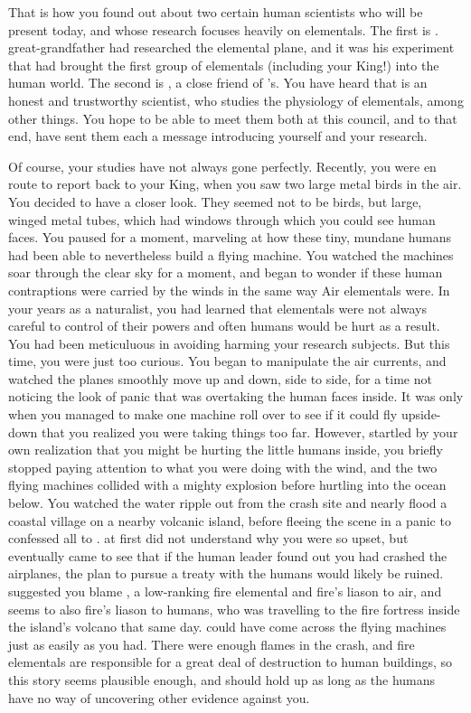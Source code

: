 \documentclass[char]{elementals}
\begin{document}
That is how you found out about two certain human scientists who will be present today, and whose research focuses heavily on elementals.  The first is \cGD{\intro}.  \cGD{\Their} great-grandfather had researched the elemental plane, and it was his experiment that had brought the first group of elementals (including your King!) into the human world.  The second is \cScientist{\intro}, a close friend of \cDiplomat{}'s.  You have heard that \cScientist{} is an honest and trustworthy scientist, who studies the physiology of elementals, among other things.  You hope to be able to meet them both at this council, and to that end, have sent them each a message introducing yourself and your research.

Of course, your studies have not always gone perfectly.  Recently, you were en route to report back to your King, when you saw two large metal birds in the air.  You decided to have a closer look.  They seemed not to be birds, but large, winged metal tubes, which had windows through which you could see human faces.  You paused for a moment, marveling at how these tiny, mundane humans had been able to nevertheless build a flying machine.  You watched the machines soar through the clear sky for a moment, and began to wonder if these human contraptions were carried by the winds in the same way Air elementals were. In your years as a naturalist, you had learned that elementals were not always careful to control of their powers and often humans would be hurt as a result.  You had been meticuluous in avoiding harming your research subjects.  But this time, you were just too curious. You began to manipulate the air currents, and watched the planes smoothly move up and down, side to side, for a time not noticing the look of panic that was overtaking the human faces inside.  It was only when you managed to make one machine roll over to see if it could fly upside-down that you realized you were taking things too far.  However, startled by your own realization that you might be hurting the little humans inside, you briefly stopped paying attention to what you were doing with the wind, and the two flying machines collided with a mighty explosion before hurtling into the ocean below.  You watched the water ripple out from the crash site and nearly flood a coastal village on a nearby volcanic island, before fleeing the scene in a panic to confessed all to \cKing{}.  \cKing{\They} at first did not understand why you were so upset, but eventually \cKing{\they} came to see that if the human leader found out you had crashed the airplanes, the  plan to pursue a treaty with the humans would likely be ruined.  \cKing{} suggested you blame \cJuliet{\intro}, a low-ranking fire elemental and fire's liason to air, and seems to also fire's liason to humans, who was travelling to the fire fortress inside the island's volcano that same day. \cJuliet{\they} could have come across the flying machines just as easily as you had.  There were enough flames in the crash, and fire elementals are responsible for a great deal of destruction to human buildings, so this story seems plausible enough, and should hold up as long as the humans have no way of uncovering other evidence against you.  
\end{document}
